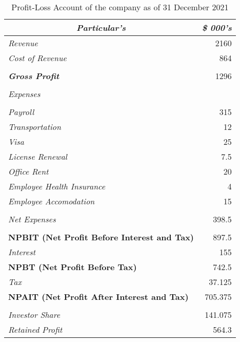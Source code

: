 \begin{table}[H]
  \centering
  \caption{Profit-Loss Account of the company as of 31 December 2021}
    \begin{tabular}{|l|r|}
    \hline
    \hline
    \toprule
    \multicolumn{1}{|c|}{\textit{\textbf{Particular's}}} & \multicolumn{1}{c|}{\textit{\textbf{\$ 000's}}} \\
    \hline
    \hline
    \midrule
    \textit{Revenue} & 2160 \\
    \midrule
    \textit{Cost of Revenue} & 864 \\
    \midrule
          &  \\
    \midrule
    \textit{\textbf{Gross Profit}} & 1296 \\
    \midrule
          &  \\
    \midrule
    \textit{Expenses} &  \\
    \midrule
          &  \\
    \midrule
    \textit{Payroll} & 315 \\
    \midrule
    \textit{Transportation} & 12 \\
    \midrule
    \textit{Visa} & 25 \\
    \midrule
    \textit{License Renewal} & 7.5 \\
    \midrule
    \textit{Office Rent} & 20 \\
    \midrule
    \textit{Employee Health Insurance} & 4 \\
    \midrule
    \textit{Employee Accomodation} & 15 \\
    \midrule
          &  \\
    \midrule
    \textit{Net Expenses} & 398.5 \\
    \midrule
          &  \\
    \midrule
    \textbf{NPBIT (Net Profit Before Interest and Tax)} & 897.5 \\
    \midrule
    \textit{Interest} & 155 \\
    \midrule
    \textbf{NPBT (Net Profit Before Tax)} & 742.5 \\
    \midrule
    \textit{Tax} & 37.125 \\
    \midrule
    \textbf{NPAIT (Net Profit After Interest and Tax)} & 705.375 \\
    \midrule
          &  \\
    \midrule
    \textit{Investor Share} & 141.075 \\
    \midrule
    \textit{Retained Profit} & 564.3 \\
    \hline
    \hline
    \bottomrule
    \end{tabular}%
  \label{tab:addlabel}%
\end{table}%

